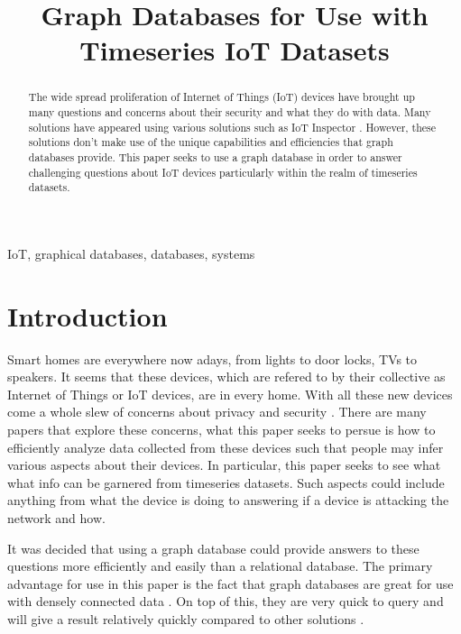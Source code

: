 \documentclass[conference]{IEEEtran}
\begin{document}
\title{Graph Databases for Use with Timeseries IoT Datasets}

\author{
}

\maketitle

\begin{abstract}
The wide spread proliferation of Internet of Things (IoT) devices
have brought up many questions and concerns about their security
and what they do with data. Many solutions have appeared using 
various solutions such as IoT Inspector \cite{IoTInspector}. 
However, these solutions don't make use of the unique capabilities
and efficiencies that graph databases provide. This paper seeks
to use a graph database in order to answer challenging questions 
about IoT devices particularly within the realm of timeseries datasets.
\end{abstract}

\begin{IEEEkeywords}
IoT, graphical databases, databases, systems
\end{IEEEkeywords}

\section{Introduction}
Smart homes are everywhere now adays, from lights to door locks, TVs to speakers.
It seems that these devices, which are refered to by their collective as Internet of Things or IoT devices, are in every home.
With all these new devices come a whole slew of concerns about privacy and security \cite{IoTInspector}.
There are many papers that explore these concerns, what this paper seeks to persue is how to efficiently analyze
data collected from these devices such that people may infer various aspects about their devices. In particular,
this paper seeks to see what what info can be garnered from timeseries datasets. Such aspects could include
anything from what the device is doing to answering if a device is attacking the network and how.

It was decided that using a graph database could provide answers to these questions
more efficiently and easily than a relational database. The primary advantage for use in this paper
is the fact that graph databases are great for use with densely connected data \cite{GraphSurvey}.
On top of this, they are very quick to query and will give a result relatively quickly compared to
other solutions \cite{GraphSurvey}.
\end{document}
